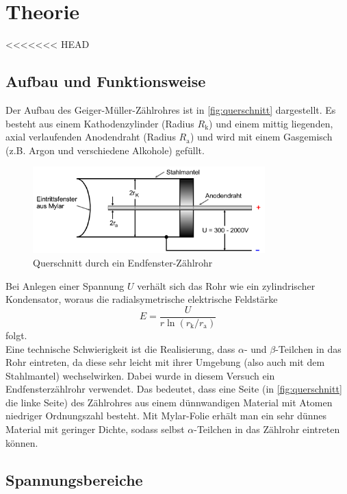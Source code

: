 \section{Theorie}
\label{sec:Theorie}

<<<<<<< HEAD
\subsection{Aufbau und Funktionsweise}
\label{sec:aufbau}

Der Aufbau des Geiger-Müller-Zählrohres ist in \autoref{fig:querschnitt} dargestellt. Es besteht aus
einem Kathodenzylinder (Radius $R_\text{k}$) und einem mittig liegenden, axial verlaufenden
Anodendraht (Radius $R_\text{a}$) und wird mit einem Gasgemisch (z.B. Argon und verschiedene Alkohole) gefüllt.
\begin{figure}[H]
	\centering
	\includegraphics[width=0.8\textwidth]{content/querschnitt.png}
	\caption{Querschnitt durch ein Endfenster-Zählrohr \cite{sample}}
	\label{fig:querschnitt}
\end{figure}
\noindent
Bei Anlegen einer Spannung $U$ verhält sich das Rohr wie ein zylindrischer Kondensator, woraus die 
radialsymetrische elektrische Feldstärke
\begin{equation}
	E = \frac{U}{r \ln(r_\text{k} / r_\text{a})}
	\label{eqn:elektrisches-feld}
\end{equation}
folgt.
\\
Eine technische Schwierigkeit ist die Realisierung, dass $\alpha$- und
$\beta$-Teilchen in das Rohr eintreten, da diese sehr leicht mit ihrer Umgebung (also auch mit dem Stahlmantel)
wechselwirken. Dabei wurde in diesem
Versuch ein Endfensterzählrohr verwendet. Das bedeutet, dass eine Seite (in \autoref{fig:querschnitt} die linke
Seite) des Zählrohres aus einem dünnwandigen Material mit Atomen niedriger Ordnungszahl besteht. Mit Mylar-Folie 
erhält man ein sehr dünnes Material mit geringer Dichte, sodass selbst $\alpha$-Teilchen in das Zählrohr eintreten 
können.

\subsection{Spannungsbereiche}
\label{sec:spannungsbereiche}

